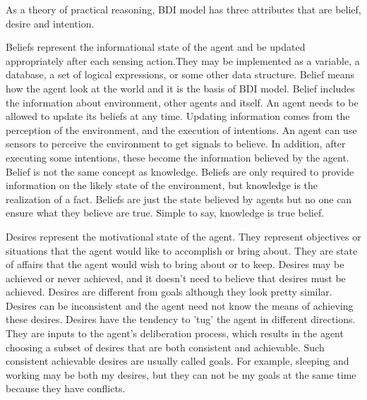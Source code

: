 As a theory of practical reasoning, BDI model has three attributes that are belief, desire and intention.

Beliefs represent the informational state of the agent and be updated appropriately after each sensing action.They may be implemented as a variable, a database, a set of logical expressions, or some other data structure\cite{Rao_BDITheory_1995}. Belief means how the agent look at the world and it is the basis of BDI model. Belief includes the information about environment, other agents and itself. An agent needs to be allowed to update its beliefs at any time. Updating information comes from the perception of the environment, and the execution of intentions. An agent can use sensors to perceive the environment to get signals to believe. In addition, after executing some intentions, these become the information believed by the agent. Belief is not the same concept as knowledge. Beliefs are only required to provide information on the likely state of the environment, but knowledge is the realization of a fact. Beliefs are just the state believed by agents but no one can ensure what they believe are true. Simple to say, knowledge is true belief.

Desires represent the motivational state of the agent\cite{Rao_BDITheory_1995}. They represent objectives or situations that the agent would like to accomplish or bring about. They are state of affairs that the agent would wish to bring about or to keep. Desires may be achieved or never achieved, and it doesn't need to believe that desires must be achieved. Desires are different from goals although they look pretty similar. Desires can be inconsistent and the agent need not know the means of achieving these desires. Desires have the tendency to 'tug' the agent in different directions. They are inputs to the agent's deliberation process, which results in the agent choosing a subset of desires that are both consistent and achievable. Such consistent achievable desires are usually called goals\cite{Gerhard_MultiSystem_1999}. For example, sleeping and working may be both my desires, but they can not be my goals at the same time because they have conflicts.

